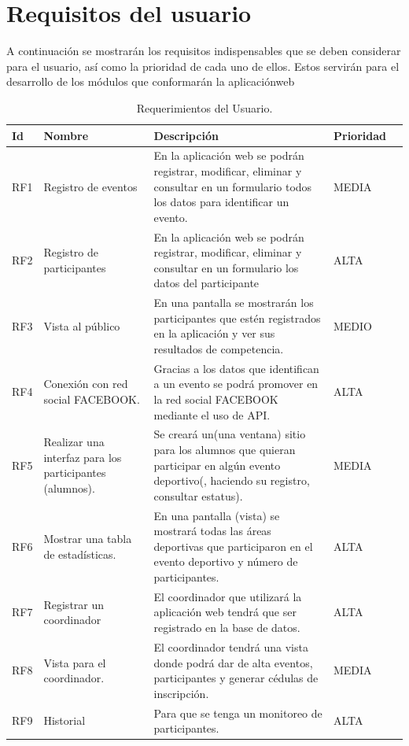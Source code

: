 	\section{Requisitos del usuario}
	A continuación se mostrarán los requisitos indispensables que se deben considerar para el usuario, así como la prioridad de cada uno de ellos. Estos servirán para el desarrollo de los módulos que conformarán la aplicaciónweb 
	\begin{table}[htbp]
		\begin{center}
			\begin{tabular}{|l|p{45mm}|p{45mm}|p{45mm}|l}
				\hline
				Id & Nombre & Descripción & Prioridad \\
				\hline 
				RF1 & Registro de eventos & En la aplicación web se podrán registrar, modificar, eliminar y consultar  en un formulario todos los datos para identificar un evento.
				& MEDIA \\ \hline
				RF2 & Registro de participantes & En la aplicación web se podrán registrar, modificar, eliminar y consultar  en un formulario los datos del participante & ALTA  \\ \hline
				RF3 & Vista al público & En una pantalla se mostrarán los participantes que estén registrados en la aplicación y ver sus resultados de competencia. & MEDIO \\ \hline
				RF4 & Conexión con red social FACEBOOK. & Gracias a los datos que identifican a un evento se podrá promover en la red social FACEBOOK mediante el uso de API.& ALTA \\ \hline
				RF5 & Realizar una interfaz para los participantes (alumnos). &Se creará un(una ventana)  sitio para los alumnos que quieran participar en algún evento deportivo(, haciendo su registro, consultar estatus). & MEDIA \\ \hline
				RF6 & Mostrar una tabla de estadísticas. & En una pantalla (vista)  se mostrará todas las áreas deportivas que participaron en el evento deportivo y  número de participantes. & ALTA \\ \hline
				RF7 & Registrar un coordinador & El coordinador que utilizará la aplicación web tendrá que ser registrado en la base de datos. & ALTA \\ \hline
				RF8 & Vista para el coordinador. &El coordinador tendrá una vista donde podrá dar de alta eventos, participantes y generar cédulas de inscripción. & MEDIA \\ \hline
				RF9  & Historial & Para que se tenga un monitoreo de participantes. & ALTA \\ \hline
			\end{tabular}
			\caption{Requerimientos del Usuario.}
			\label{tabla:sencilla}
		\end{center}
	\end{table}
	\pagebreak
	

